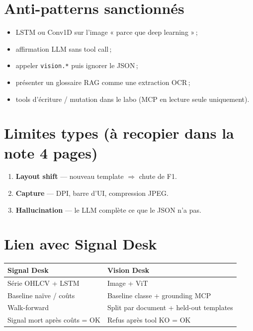 \documentclass[11pt,a4paper]{article}
\begin{document}
\section{Anti-patterns sanctionnés}

\begin{itemize}
  \item LSTM ou Conv1D sur l'image « parce que deep learning »\,;
  \item affirmation LLM sans tool call\,;
  \item appeler \texttt{vision.*} puis ignorer le JSON\,;
  \item présenter un glossaire RAG comme une extraction OCR\,;
  \item tools d'écriture / mutation dans le labo (MCP en lecture seule uniquement).
\end{itemize}

\section{Limites types (à recopier dans la note 4 pages)}

\begin{enumerate}
  \item \textbf{Layout shift} --- nouveau template $\Rightarrow$ chute de F1.
  \item \textbf{Capture} --- DPI, barre d'UI, compression JPEG.
  \item \textbf{Hallucination} --- le LLM complète ce que le JSON n'a pas.
\end{enumerate}

\section{Lien avec Signal Desk}

\begin{center}
\renewcommand{\arraystretch}{1.15}
\begin{tabular}{@{}p{5.5cm}p{8.5cm}@{}}
\toprule
\textbf{Signal Desk} & \textbf{Vision Desk} \\
\midrule
Série OHLCV + LSTM & Image + ViT \\
Baseline naïve / coûts & Baseline classe + grounding MCP \\
Walk-forward & Split par document + held-out templates \\
Signal mort après coûts = OK & Refus après tool KO = OK \\
\bottomrule
\end{tabular}
\end{center}
\end{document}
